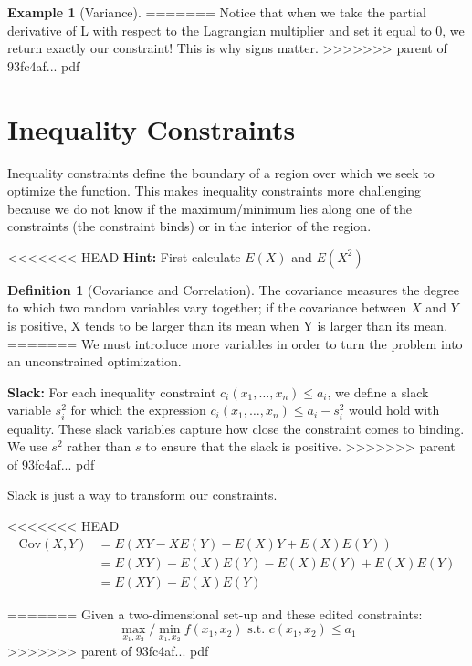 \documentclass[]{book}
\theoremstyle{definition}
\newtheorem{definition}{Definition}[chapter]
\theoremstyle{definition}
\newtheorem{example}{Example}[chapter]
\theoremstyle{definition}
\theoremstyle{remark}
\begin{document}
\begin{example}[Variance]
\protect\hypertarget{exm:var}{}{\label{exm:var} {} }
=======
Notice that when we take the partial derivative of L with respect to the Lagrangian multiplier and set it equal to 0, we return exactly our constraint! This is why signs matter.
>>>>>>> parent of 93fc4af... pdf

\hypertarget{inequality-constraints}{%
\section{Inequality Constraints}\label{inequality-constraints}}

Inequality constraints define the boundary of a region over which we seek to optimize the function. This makes inequality constraints more challenging because we do not know if the maximum/minimum lies along one of the constraints (the constraint binds) or in the interior of the region.

<<<<<<< HEAD
\textbf{Hint:} First calculate \(E(X)\) and \(E(X^2)\)
\end{example}

\begin{definition}[Covariance and Correlation]
\protect\hypertarget{def:unnamed-chunk-85}{}{\label{def:unnamed-chunk-85} {} }
The covariance measures the degree to which two random variables vary together; if the covariance between \(X\) and \(Y\) is positive, X tends to be larger than its mean when Y is larger than its mean.
=======
We must introduce more variables in order to turn the problem into an unconstrained optimization.

\textbf{Slack:} For each inequality constraint \(c_i(x_1, \dots, x_n) \leq a_i\), we define a slack variable \(s_i^2\) for which the expression \(c_i(x_1, \dots, x_n) \leq a_i - s_i^2\) would hold with equality. These slack variables capture how close the constraint comes to binding. We use \(s^2\) rather than \(s\) to ensure that the slack is positive.
>>>>>>> parent of 93fc4af... pdf

Slack is just a way to transform our constraints.

<<<<<<< HEAD
\begin{align*}
\text{Cov}(X,Y) &= E\left(XY - XE(Y) - E(X)Y + E(X)E(Y)\right)\\
&= E(XY) - E(X)E(Y) - E(X)E(Y) + E(X)E(Y)\\
&= E(XY) - E(X)E(Y)
\end{align*}
\end{definition}
=======
Given a two-dimensional set-up and these edited constraints:
\[\max_{x_1,x_2}/\min_{x_1,x_2} f(x_1,x_2) \text{ s.t. } c(x_1,x_2) \le a_1\]
>>>>>>> parent of 93fc4af... pdf
\end{document}
